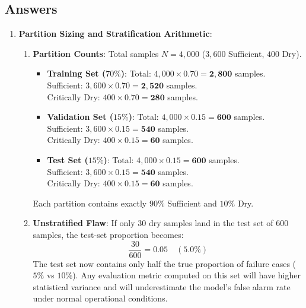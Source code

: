 \subsection*{Answers}

\begin{enumerate}
    \item \textbf{Partition Sizing and Stratification Arithmetic}:
    \begin{enumerate}[label=(\alph*)]
        \item \textbf{Partition Counts}:
        Total samples $N = 4{,}000$ ($3{,}600$ Sufficient, $400$ Dry).
        \begin{itemize}
            \item \textbf{Training Set ($70\%$)}:
            Total: $4{,}000 \times 0.70 = \mathbf{2{,}800}$ samples. \\
            Sufficient: $3{,}600 \times 0.70 = \mathbf{2{,}520}$ samples. \\
            Critically Dry: $400 \times 0.70 = \mathbf{280}$ samples.
            \item \textbf{Validation Set ($15\%$)}:
            Total: $4{,}000 \times 0.15 = \mathbf{600}$ samples. \\
            Sufficient: $3{,}600 \times 0.15 = \mathbf{540}$ samples. \\
            Critically Dry: $400 \times 0.15 = \mathbf{60}$ samples.
            \item \textbf{Test Set ($15\%$)}:
            Total: $4{,}000 \times 0.15 = \mathbf{600}$ samples. \\
            Sufficient: $3{,}600 \times 0.15 = \mathbf{540}$ samples. \\
            Critically Dry: $400 \times 0.15 = \mathbf{60}$ samples.
        \end{itemize}
        Each partition contains exactly $90\%$ Sufficient and $10\%$ Dry.

        \item \textbf{Unstratified Flaw}:
        If only $30$ dry samples land in the test set of $600$ samples, the test-set proportion becomes:
        \begin{equation*}
        \frac{30}{600} = 0.05 \quad (5.0\%)
        \end{equation*}
        The test set now contains only half the true proportion of failure cases ($5\%$ vs $10\%$). Any evaluation metric computed on this set will have higher statistical variance and will underestimate the model's false alarm rate under normal operational conditions.
    \end{enumerate}


\end{enumerate}
